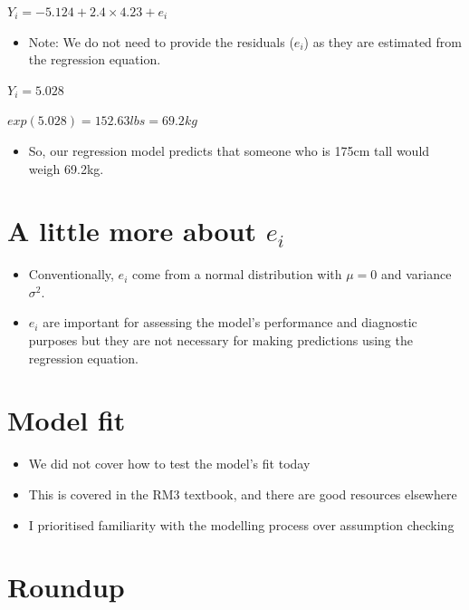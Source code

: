 \documentclass[
]{article}
\providecommand{\tightlist}{%
  \setlength{\itemsep}{0pt}\setlength{\parskip}{0pt}}
\begin{document}
\(Y_i = -5.124 + 2.4 \times 4.23 + e_i\)

\begin{itemize}
\tightlist
\item
  Note: We do not need to provide the residuals (\(e_i\)) as they are
  estimated from the regression equation.
\end{itemize}

\(Y_i = 5.028\)

\(exp(5.028) = 152.63lbs = 69.2kg\)

\begin{itemize}
\tightlist
\item
  So, our regression model predicts that someone who is 175cm tall would
  weigh 69.2kg.
\end{itemize}

\hypertarget{a-little-more-about-e_i}{%
\section{\texorpdfstring{A little more about
\(e_i\)}{A little more about e\_i}}\label{a-little-more-about-e_i}}

\begin{itemize}
\tightlist
\item
  Conventionally, \(e_i\) come from a normal distribution with
  \(\mu = 0\) and variance \(\sigma^2\).
\item
  \(e_i\) are important for assessing the model's performance and
  diagnostic purposes but they are not necessary for making predictions
  using the regression equation.
\end{itemize}

\hypertarget{model-fit}{%
\section{Model fit}\label{model-fit}}

\begin{itemize}
\tightlist
\item
  We did not cover how to test the model's fit today
\item
  This is covered in the RM3 textbook, and there are good resources
  elsewhere
\item
  I prioritised familiarity with the modelling process over assumption
  checking
\end{itemize}

\hypertarget{roundup}{%
\section{Roundup}\label{roundup}}
\end{document}
